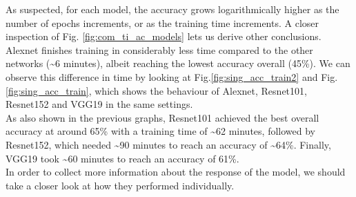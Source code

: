 As suspected, for each model, the accuracy grows logarithmically higher as the number of  epochs increments, or as the training time increments. A closer inspection of Fig. \ref{fig:com_ti_ac_models} lets us derive other conclusions. Alexnet finishes training in considerably less time compared to the other networks (\textasciitilde 6 minutes), albeit reaching the lowest accuracy overall (45\%). We can observe this difference in time by looking at Fig.\ref{fig:sing_acc_train2} and Fig.\ref{fig:sing_acc_train}, which shows the behaviour of Alexnet, Resnet101, Resnet152 and VGG19 in the same settings. \\
As also shown in the previous graphs, Resnet101 achieved the best overall accuracy at around 65\% with a training time of \textasciitilde 62 minutes, followed by Resnet152, which needed  \textasciitilde 90 minutes to reach an accuracy of \textasciitilde 64\%. Finally, VGG19 took \textasciitilde 60 minutes to reach an accuracy of 61\%. \\
In order to collect more information about the response of the model, we should take a closer look at how they performed individually.\\

